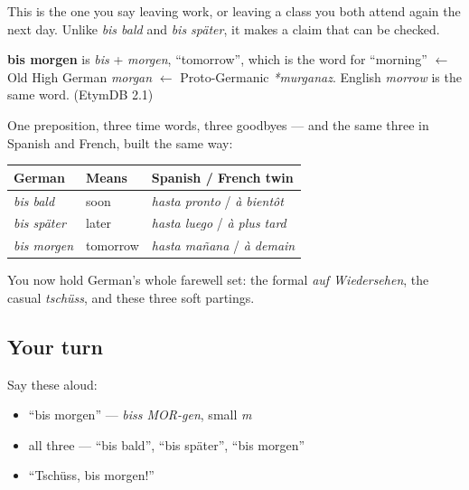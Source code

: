 This is the one you say leaving work, or leaving a class you both attend again the next day. Unlike \emph{bis bald} and \emph{bis später}, it makes a claim that can be checked.

\begin{cousinweb}
\textbf{bis morgen} is \emph{bis} + \emph{morgen}, \textquotedblleft{}tomorrow\textquotedblright{}, which is the word for \textquotedblleft{}morning\textquotedblright{} $\leftarrow$ Old High German \emph{morgan} $\leftarrow$ Proto-Germanic \emph{*murganaz}. English \emph{morrow} is the same word. (EtymDB 2.1)
\end{cousinweb}

\begin{grammarlens}[title={Grammar Lens: the bis… family, complete}]
One preposition, three time words, three goodbyes — and the same three in Spanish and French, built the same way:

\noindent
\begin{tabularx}{\linewidth}{@{}>{\raggedright\arraybackslash}X>{\raggedright\arraybackslash}X>{\raggedright\arraybackslash}X@{}}
\toprule
\textbf{German} & \textbf{Means} & \textbf{Spanish / French twin} \\
\midrule
\emph{bis bald} & soon & \emph{hasta pronto} / \emph{à bientôt} \\
\emph{bis später} & later & \emph{hasta luego} / \emph{à plus tard} \\
\emph{bis morgen} & tomorrow & \emph{hasta mañana} / \emph{à demain} \\
\bottomrule
\end{tabularx}

You now hold German's whole farewell set: the formal \emph{auf Wiedersehen}, the casual \emph{tschüss}, and these three soft partings.
\end{grammarlens}

\subsection*{Your turn}
Say these aloud:

\begin{itemize}
\raggedright
  \item \textquotedblleft{}bis morgen\textquotedblright{} — \emph{biss MOR-gen}, small \emph{m}
  \item all three — \textquotedblleft{}bis bald\textquotedblright{}, \textquotedblleft{}bis später\textquotedblright{}, \textquotedblleft{}bis morgen\textquotedblright{}
  \item \textquotedblleft{}Tschüss, bis morgen!\textquotedblright{}
\end{itemize}

